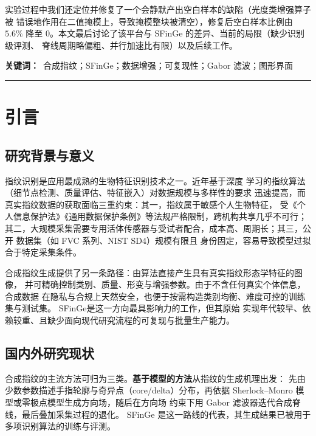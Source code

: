\documentclass[UTF8, fontset=windows, a4paper, 11pt]{ctexart}
\begin{document}
实验过程中我们还定位并修复了一个会静默产出空白样本的缺陷（光度类增强算子被
错误地作用在二值掩模上，导致掩模整块被清空），修复后空白样本比例由 $5.6\%$
降至 $0$。本文最后讨论了该平台与 SFinGe 的差异、当前的局限（缺少识别级评测、
脊线周期略偏粗、并行加速比有限）以及后续工作。

\vspace{4pt}
\noindent\textbf{关键词：}\ 合成指纹；SFinGe；数据增强；可复现性；Gabor 滤波；图形界面

\vspace{2pt}
\begin{center}\rule{0.9\textwidth}{0.4pt}\end{center}

\clearpage
\tableofcontents
\newpage

\section{引言}

\subsection{研究背景与意义}

指纹识别是应用最成熟的生物特征识别技术之一\cite{maltoni2009}。近年基于深度
学习的指纹算法（细节点检测、质量评估、特征嵌入）对数据规模与多样性的要求
迅速提高，而真实指纹数据的获取面临三重约束：其一，指纹属于敏感个人生物特征，
受《个人信息保护法》《通用数据保护条例》等法规严格限制，跨机构共享几乎不可行；
其二，大规模采集需要专用活体传感器与受试者配合，成本高、周期长；其三，公开
数据集（如 FVC 系列\cite{maio2002}、NIST SD4\cite{watson1992}）规模有限且
身份固定，容易导致模型过拟合于特定采集条件。

合成指纹生成提供了另一条路径：由算法直接产生具有真实指纹形态学特征的图像，
并可精确控制类别、质量、形变与增强参数。由于不含任何真实个体信息，合成数据
在隐私与合规上天然安全，也便于按需构造类别均衡、难度可控的训练集与测试集。
SFinGe\cite{cappelli2000,cappelli2004}是这一方向最具影响力的工作，但其原始
实现年代较早、依赖较重、且缺少面向现代研究流程的可复现与批量生产能力。

\subsection{国内外研究现状}

合成指纹的主流方法可归为三类。\textbf{基于模型的方法}从指纹的生成机理出发：
先由少数参数描述手指轮廓与奇异点（core/delta）分布，再依据 Sherlock--Monro
模型\cite{sherlock1994}或零极点模型\cite{vizcaya1996}生成方向场，随后在方向场
约束下用 Gabor 滤波器迭代合成脊线\cite{hong1998}，最后叠加采集过程的退化。
SFinGe 是这一路线的代表，其生成结果已被用于多项识别算法的训练与评测。
\end{document}
